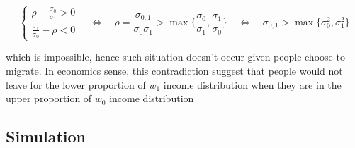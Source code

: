 \documentclass[11pt]{article}
\begin{document}
\begin{enumerate}
            \[ 
                \left\{ \begin{aligned}
                \rho - \frac{\sigma_0}{\sigma_1} > 0 \\
                \frac{\sigma_1}{\sigma_0} - \rho < 0
                \end{aligned} \right.
                \quad\Leftrightarrow\quad 
                \rho = \frac{\sigma_{0,1}}{\sigma_0\sigma_1} > \max\{\frac{\sigma_0}{\sigma_1}, \frac{\sigma_1}{\sigma_0}\}
                \quad\Leftrightarrow\quad 
                \sigma_{0,1} > \max\{\sigma_0^2,\sigma_1^2\}
            \]

            which is impossible, hence such situation doesn't occur given people choose to migrate. In economics sense, this contradiction suggest that people would not leave for the lower proportion of $w_1$ income distribution when they are in the upper proportion of $w_0$ income distribution


        \end{enumerate}

    \subsection{Simulation}
\end{document}
